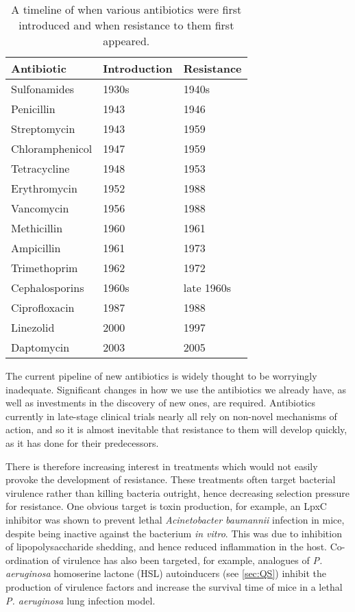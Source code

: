 \begin{table}[H]
  \centering
\begin{tabular}{|p{}|p{}|p{}|}
\hline  
\textbf{Antibiotic} & \textbf{Introduction} & \textbf{Resistance} \\ 
\hline
Sulfonamides & 1930s & 1940s \\ 
\hline 
Penicillin & 1943 & 1946 \\ 
\hline 
Streptomycin & 1943 & 1959 \\ 
\hline 
Chloramphenicol & 1947 & 1959 \\ 
\hline 
Tetracycline & 1948 & 1953 \\ 
\hline 
Erythromycin & 1952 & 1988 \\ 
\hline 
Vancomycin & 1956 & 1988 \\ 
\hline 
Methicillin & 1960 & 1961 \\ 
\hline 
Ampicillin & 1961 & 1973 \\ 
\hline 
Trimethoprim & 1962 & 1972 \\
\hline 
Cephalosporins & 1960s & late 1960s \\
\hline 
Ciprofloxacin & 1987 & 1988 \\
\hline 
Linezolid & 2000 & 1997 \\
\hline
Daptomycin & 2003 & 2005\\
\hline
\end{tabular}
\caption{A timeline of when various antibiotics were first introduced and when resistance to them first appeared\cite{Clatworthy2007,Palumbi2001,Ogle1988,Huovinen2001,Birmingham2003,Lee2007}.\label{tbl:AB_timeline}} 
\end{table}

The current pipeline of new antibiotics is widely thought to be worryingly inadequate\cite{Boucher2009,WHO,WEF}. Significant changes in how we use the antibiotics we already have, as well as investments in the discovery of new ones, are required.
Antibiotics currently in late-stage clinical trials nearly all rely on non-novel mechanisms of action\cite{Boucher2009}, and so it is almost inevitable that resistance to them will develop quickly, as it has done for their predecessors.

There is therefore increasing interest in treatments which would not easily provoke the development of resistance\cite{Spellberg2013}. These treatments often target bacterial virulence rather than killing bacteria outright, hence decreasing selection pressure for resistance\cite{Clatworthy2007}. 
One obvious target is toxin production, for example, an LpxC inhibitor was shown to prevent lethal \textit{Acinetobacter baumannii} infection in mice, despite being inactive against the bacterium \textit{in vitro}\cite{Lin2012}. This was due to inhibition of lipopolysaccharide shedding, and hence reduced inflammation in the host.
Co-ordination of virulence has also been targeted, for example, analogues of \textit{P. aeruginosa} homoserine lactone (HSL) autoinducers (see \ref{sec:QS}) inhibit the production of virulence factors and increase the survival time of mice in a lethal \textit{P. aeruginosa} lung infection model\cite{Clatworthy2007}.

